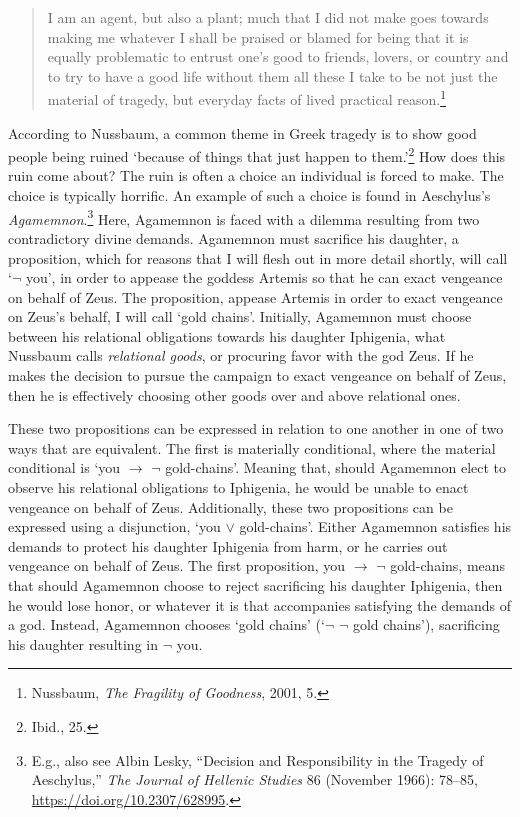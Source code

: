 \documentclass[phdthesis,12pt,final]{wuthesis}
\theoremstyle{definition}
\theoremstyle{definition}
\theoremstyle{definition}
\theoremstyle{definition}
\theoremstyle{remark}
\begin{document}
\begin{quote}
I am an agent, but also a plant; much that I did not make goes towards making me whatever I shall be praised or blamed for being that it is equally problematic to entrust one's good to friends, lovers, or country and to try to have a good life without them all these I take to be not just the material of tragedy, but everyday facts of lived practical reason.\footnote{Nussbaum, \emph{The {Fragility} of {Goodness}}, 2001, 5.}
\end{quote}

According to Nussbaum, a common theme in Greek tragedy is to show good people being ruined `because of things that just happen to them.'\footnote{Ibid., 25.} How does this ruin come about? The ruin is often a choice an individual is forced to make. The choice is typically horrific. An example of such a choice is found in Aeschylus's \emph{Agamemnon}.\footnote{E.g., also see Albin Lesky, {``Decision and {Responsibility} in the {Tragedy} of {Aeschylus},''} \emph{The Journal of Hellenic Studies} 86 (November 1966): 78--85, \url{https://doi.org/10.2307/628995}.} Here, Agamemnon is faced with a dilemma resulting from two contradictory divine demands. Agamemnon must sacrifice his daughter, a proposition, which for reasons that I will flesh out in more detail shortly, will call `\(\lnot\) you', in order to appease the goddess Artemis so that he can exact vengeance on behalf of Zeus. The proposition, appease Artemis in order to exact vengeance on Zeus's behalf, I will call `gold chains'. Initially, Agamemnon must choose between his relational obligations towards his daughter Iphigenia, what Nussbaum calls \emph{relational goods}, or procuring favor with the god Zeus. If he makes the decision to pursue the campaign to exact vengeance on behalf of Zeus, then he is effectively choosing other goods over and above relational ones.

These two propositions can be expressed in relation to one another in one of two ways that are equivalent. The first is materially conditional, where the material conditional is `you \(\rightarrow\) \(\lnot\) gold-chains'. Meaning that, should Agamemnon elect to observe his relational obligations to Iphigenia, he would be unable to enact vengeance on behalf of Zeus. Additionally, these two propositions can be expressed using a disjunction, `you \(\lor\) gold-chains'. Either Agamemnon satisfies his demands to protect his daughter Iphigenia from harm, or he carries out vengeance on behalf of Zeus. The first proposition, you \(\rightarrow\) \(\lnot\) gold-chains, means that should Agamemnon choose to reject sacrificing his daughter Iphigenia, then he would lose honor, or whatever it is that accompanies satisfying the demands of a god. Instead, Agamemnon chooses `gold chains' (`\(\lnot\) \(\lnot\) gold chains'), sacrificing his daughter resulting in \(\lnot\) you.
\end{document}
